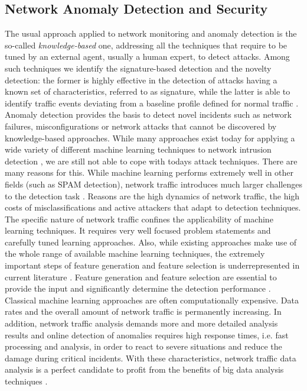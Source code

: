 \documentclass[10pt, conference, letterpaper]{IEEEtran}
\begin{document}
\subsection{Network Anomaly Detection and Security}

The usual approach applied to network monitoring and anomaly detection is the so-called \textit{knowledge-based} one, addressing all the techniques that require to be tuned by an external agent, usually a human expert, to detect attacks. Among such techniques we identify the signature-based detection and the novelty detection: the former is highly effective in the detection of attacks having a known set of characteristics, referred to as signature, while the latter is able to identify traffic events deviating from a baseline profile defined for normal traffic \cite{casas2012}. Anomaly detection provides the basis to detect novel incidents such as network failures, misconfigurations or network attacks that cannot be discovered by knowledge-based approaches. While many approaches exist today for applying a wide variety of different machine learning techniques to network intrusion detection \cite{sperotto2010,panda2011,syarif2012,khan2007,marnerides2014,casas2012}, we are still not able to cope with todays attack techniques. There are many reasons for this. While machine learning performs extremely well in other fields (such as SPAM detection), network traffic introduces much larger challenges to the detection task \cite{sommer2010}. Reasons are the high dynamics of network traffic, the high costs of misclassifications and active attackers that adapt to detection techniques. The specific nature of network traffic confines the applicability of machine learning techniques. It requires very well focused problem statements and carefully tuned learning approaches. Also, while existing approaches make use of the whole range of available machine learning techniques, the extremely important steps of feature generation and feature selection is underrepresented in current literature \cite{tavallaee2010}. Feature generation and feature selection are essential to provide the input and significantly determine the detection performance \cite{iglesias2014}. Classical machine learning approaches are often computationally expensive. Data rates and the overall amount of network traffic is permanently increasing. In addition, network traffic analysis demands more and more detailed analysis results and online detection of anomalies requires high response times, i.e. fast processing and analysis, in order to react to severe situations and reduce the damage during critical incidents. With these characteristics, network traffic data analysis is a perfect candidate to profit from the benefits of big data analysis techniques \cite{sagiroglu2013,costa2012}. 
\end{document}
